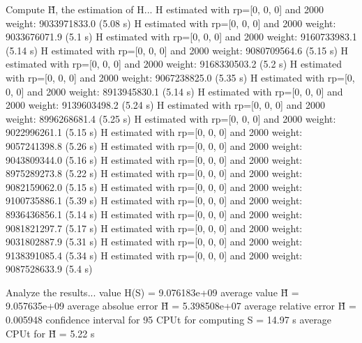 Compute H̃, the estimation of H...
  H estimated with rp=[0, 0, 0] and 2000 weight:  9033971833.0  (5.08 s)
  H estimated with rp=[0, 0, 0] and 2000 weight:  9033676071.9  (5.1 s)
  H estimated with rp=[0, 0, 0] and 2000 weight:  9160733983.1  (5.14 s)
  H estimated with rp=[0, 0, 0] and 2000 weight:  9080709564.6  (5.15 s)
  H estimated with rp=[0, 0, 0] and 2000 weight:  9168330503.2  (5.2 s)
  H estimated with rp=[0, 0, 0] and 2000 weight:  9067238825.0  (5.35 s)
  H estimated with rp=[0, 0, 0] and 2000 weight:  8913945830.1  (5.14 s)
  H estimated with rp=[0, 0, 0] and 2000 weight:  9139603498.2  (5.24 s)
  H estimated with rp=[0, 0, 0] and 2000 weight:  8996268681.4  (5.25 s)
  H estimated with rp=[0, 0, 0] and 2000 weight:  9022996261.1  (5.15 s)
  H estimated with rp=[0, 0, 0] and 2000 weight:  9057241398.8  (5.26 s)
  H estimated with rp=[0, 0, 0] and 2000 weight:  9043809344.0  (5.16 s)
  H estimated with rp=[0, 0, 0] and 2000 weight:  8975289273.8  (5.22 s)
  H estimated with rp=[0, 0, 0] and 2000 weight:  9082159062.0  (5.15 s)
  H estimated with rp=[0, 0, 0] and 2000 weight:  9100735886.1  (5.39 s)
  H estimated with rp=[0, 0, 0] and 2000 weight:  8936436856.1  (5.14 s)
  H estimated with rp=[0, 0, 0] and 2000 weight:  9081821297.7  (5.17 s)
  H estimated with rp=[0, 0, 0] and 2000 weight:  9031802887.9  (5.31 s)
  H estimated with rp=[0, 0, 0] and 2000 weight:  9138391085.4  (5.34 s)
  H estimated with rp=[0, 0, 0] and 2000 weight:  9087528633.9  (5.4 s)

Analyze the results...
  value H(S)                  = 9.076183e+09 
  average value H̃             = 9.057635e+09 
  average absolue error H̃     = 5.398508e+07 
  average relative error H̃    = 0.005948 
  confidence interval for 95%
  CPUt for computing S         = 14.97 s
  average CPUt for H̃           = 5.22 s

